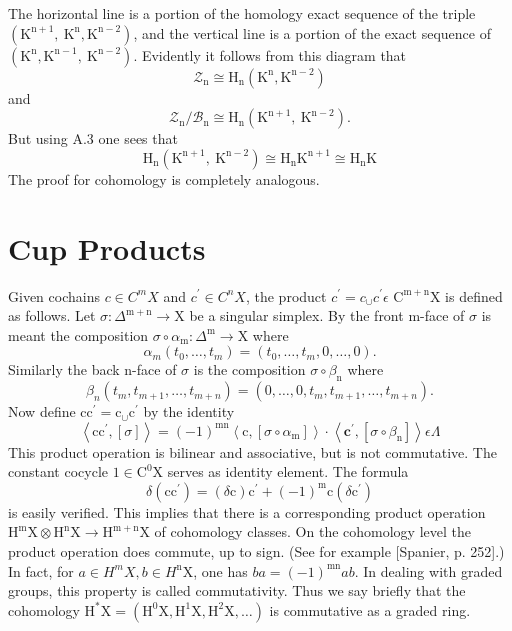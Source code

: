 \documentclass[10pt]{article}
\begin{document}
The horizontal line is a portion of the homology exact sequence of the triple $\left(\mathrm{K}^{\mathrm{n}+1}, \mathrm{~K}^{\mathrm{n}}, \mathrm{K}^{\mathrm{n}-2}\right)$, and the vertical line is a portion of the exact sequence of $\left(\mathrm{K}^{\mathrm{n}}, \mathrm{K}^{\mathrm{n}-1}, \mathrm{~K}^{\mathrm{n}-2}\right)$. Evidently it follows from this diagram that
$$
\mathcal{Z}_{\mathrm{n}} \cong \mathrm{H}_{\mathrm{n}}\left(\mathrm{K}^{\mathrm{n}}, \mathrm{K}^{\mathrm{n}-2}\right)
$$
and
$$
\mathcal{Z}_{\mathrm{n}} / \mathcal{B}_{\mathrm{n}} \cong \mathrm{H}_{\mathrm{n}}\left(\mathrm{K}^{\mathrm{n}+1}, \mathrm{~K}^{\mathrm{n}-2}\right) .
$$
But using A.3 one sees that
$$
\mathrm{H}_{\mathrm{n}}\left(\mathrm{K}^{\mathrm{n}+1}, \mathrm{~K}^{\mathrm{n}-2}\right) \cong \mathrm{H}_{\mathrm{n}} \mathrm{K}^{\mathrm{n}+1} \cong \mathrm{H}_{\mathrm{n}} \mathrm{K}
$$
The proof for cohomology is completely analogous.

\section{Cup Products}
Given cochains $c \in C^{m} X$ and $c^{\prime} \in C^{n} X$, the product $c^{\prime}=c_{\cup} c^{\prime} \epsilon$ $\mathrm{C}^{\mathrm{m}+\mathrm{n}} \mathrm{X}$ is defined as follows. Let $\sigma: \Delta^{\mathrm{m}+\mathrm{n}} \rightarrow \mathrm{X}$ be a singular simplex. By the front $\mathrm{m}$-face of $\sigma$ is meant the composition $\sigma \circ \alpha_{\mathrm{m}}: \Delta^{\mathrm{m}} \rightarrow \mathrm{X}$ where
$$
\alpha_{m}\left(t_{0}, \ldots, t_{m}\right)=\left(t_{0}, \ldots, t_{m}, 0, \ldots, 0\right) .
$$
Similarly the back n-face of $\sigma$ is the composition $\sigma \circ \beta_{\mathrm{n}}$ where
$$
\beta_{n}\left(t_{m}, t_{m+1}, \ldots, t_{m+n}\right)=\left(0, \ldots, 0, t_{m}, t_{m+1}, \ldots, t_{m+n}\right) .
$$
Now define $\mathrm{cc}^{\prime}=\mathrm{c}_{\cup} \mathrm{c}^{\prime}$ by the identity
$$
\left\langle\mathrm{cc}^{\prime},[\sigma]\right\rangle=(-1)^{\mathrm{mn}}\left\langle\mathrm{c},\left[\sigma \circ \alpha_{\mathrm{m}}\right]\right\rangle \cdot\left\langle\mathbf{c}^{\prime},\left[\sigma \circ \beta_{\mathrm{n}}\right]\right\rangle \epsilon \Lambda
$$
This product operation is bilinear and associative, but is not commutative. The constant cocycle $1 \in \mathrm{C}^{0} \mathrm{X}$ serves as identity element. The formula
$$
\delta\left(\mathrm{cc}^{\prime}\right)=(\delta \mathrm{c}) \mathrm{c}^{\prime}+(-1)^{\mathrm{m}} \mathrm{c}\left(\delta \mathrm{c}^{\prime}\right)
$$
is easily verified. This implies that there is a corresponding product operation $\mathrm{H}^{\mathrm{m}} \mathrm{X} \otimes \mathrm{H}^{\mathrm{n}} \mathrm{X} \rightarrow \mathrm{H}^{\mathrm{m}+\mathrm{n}} \mathrm{X}$ of cohomology classes. On the cohomology level the product operation does commute, up to sign. (See for example [Spanier, p. 252].) In fact, for $a \in H^{m} X, b \in H^{\mathrm{n}} \mathrm{X}$, one has $b a=(-1)^{\mathrm{mn}} a b$. In dealing with graded groups, this property is called commutativity. Thus we say briefly that the cohomology $\mathrm{H}^{*} \mathrm{X}=\left(\mathrm{H}^{0} \mathrm{X}, \mathrm{H}^{1} \mathrm{X}, \mathrm{H}^{2} \mathrm{X}, \ldots\right)$ is commutative as a graded ring.
\end{document}
